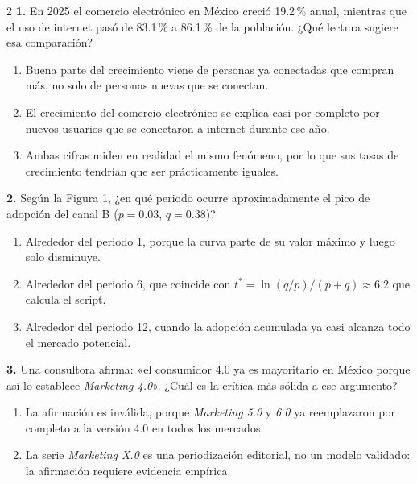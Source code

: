 \documentclass[10pt,letterpaper]{article}
\begin{document}
\begin{multicols}{2}
\noindent\textbf{1.} En 2025 el comercio electrónico en México creció 19.2\,\% anual, mientras que el uso de internet pasó de 83.1\,\% a 86.1\,\% de la población. ¿Qué lectura sugiere esa comparación?
\vspace{-3pt}
\begin{enumerate}[label=\alph*),leftmargin=1.1em,itemsep=0pt,topsep=1pt,parsep=0pt,partopsep=0pt]
\item Buena parte del crecimiento viene de personas ya conectadas que compran más, no solo de personas nuevas que se conectan.
\item El crecimiento del comercio electrónico se explica casi por completo por nuevos usuarios que se conectaron a internet durante ese año.
\item Ambas cifras miden en realidad el mismo fenómeno, por lo que sus tasas de crecimiento tendrían que ser prácticamente iguales.
\end{enumerate}
\vspace{2pt}
\noindent\textbf{2.} Según la Figura 1, ¿en qué periodo ocurre aproximadamente el pico de adopción del canal B ($p=0.03$, $q=0.38$)?
\vspace{-3pt}
\begin{enumerate}[label=\alph*),leftmargin=1.1em,itemsep=0pt,topsep=1pt,parsep=0pt,partopsep=0pt]
\item Alrededor del periodo 1, porque la curva parte de su valor máximo y luego solo disminuye.
\item Alrededor del periodo 6, que coincide con $t^\ast=\ln(q/p)/(p+q)\approx 6.2$ que calcula el script.
\item Alrededor del periodo 12, cuando la adopción acumulada ya casi alcanza todo el mercado potencial.
\end{enumerate}
\vspace{2pt}
\noindent\textbf{3.} Una consultora afirma: «el consumidor 4.0 ya es mayoritario en México porque así lo establece \textit{Marketing 4.0}». ¿Cuál es la crítica más sólida a ese argumento?
\vspace{-3pt}
\begin{enumerate}[label=\alph*),leftmargin=1.1em,itemsep=0pt,topsep=1pt,parsep=0pt,partopsep=0pt]
\item La afirmación es inválida, porque \textit{Marketing 5.0} y \textit{6.0} ya reemplazaron por completo a la versión 4.0 en todos los mercados.
\item La serie \textit{Marketing X.0} es una periodización editorial, no un modelo validado: la afirmación requiere evidencia empírica.

\end{enumerate}
\end{multicols}
\end{document}
